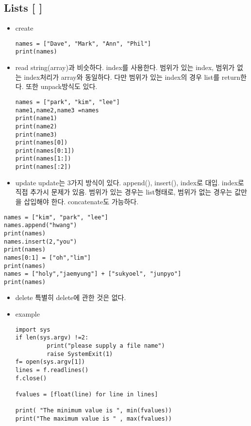 \documentclass[11pt]{article}
\begin{document}
\subsection{Lists [ ]}
\label{sec:orge05e45a}
\begin{itemize}
\item create
\begin{verbatim}
names = ["Dave", "Mark", "Ann", "Phil"]
print(names)
\end{verbatim}

\item read
string(array)과 비슷하다. index를 사용한다. 범위가 있는 index, 범위가 없는 index처리가 array와 동일하다. 다만 범위가 있는 index의 경우 list를 return한다. 또한 unpack방식도 있다.
\begin{verbatim}
names = ["park", "kim", "lee"]
name1,name2,name3 =names 
print(name1)
print(name2)
print(name3)
print(names[0])
print(names[0:1])
print(names[1:])
print(names[:2])
\end{verbatim}

\item update
update는 3가지 방식이 있다. append(), insert(), index로 대입. index로 직접 추가시 문제가 있음. 범위가 있는 경우는 list형태로,  범위가 없는 경우는 값만을 삽입해야 한다. concatenate도 가능하다.
\end{itemize}
\begin{verbatim}
names = ["kim", "park", "lee"]
names.append("hwang")
print(names)
names.insert(2,"you")
print(names)
names[0:1] = ["oh","lim"]
print(names)
names = ["holy","jaemyung"] + ["sukyoel", "junpyo"]
print(names)
\end{verbatim}

\begin{itemize}
\item delete
특별히 delete에 관한 것은 없다.

\item example
\begin{verbatim}
import sys
if len(sys.argv) !=2:
	     print("please supply a file name")
	     raise SystemExit(1)
f= open(sys.argv[1])
lines = f.readlines()
f.close()

fvalues = [float(line) for line in lines]

print( "The minimum value is ", min(fvalues))
print("The maximum value is " , max(fvalues))
\end{verbatim}
\end{itemize}
\end{document}
